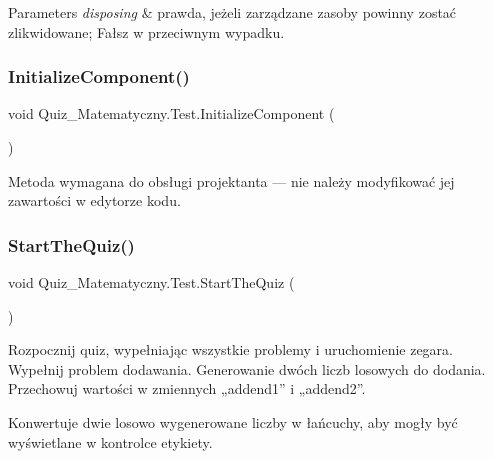 \begin{DoxyParams}{Parameters}
{\em disposing} & prawda, jeżeli zarządzane zasoby powinny zostać zlikwidowane; Fałsz w przeciwnym wypadku.\\
\hline
\end{DoxyParams}
\mbox{\label{class_quiz___matematyczny_1_1_test_a6b40aa6b3256a95c2e6b54781d02d7f4}} 
\subsubsection{\texorpdfstring{InitializeComponent()}{InitializeComponent()}}
{\footnotesize\ttfamily void Quiz\+\_\+\+Matematyczny.\+Test.\+Initialize\+Component (\begin{DoxyParamCaption}{ }\end{DoxyParamCaption})\hspace{0.3cm}{\ttfamily [private]}}



Metoda wymagana do obsługi projektanta — nie należy modyfikować jej zawartości w edytorze kodu. 

\mbox{\label{class_quiz___matematyczny_1_1_test_a1573753aacf25f312207d67b109e96bf}} 
\subsubsection{\texorpdfstring{StartTheQuiz()}{StartTheQuiz()}}
{\footnotesize\ttfamily void Quiz\+\_\+\+Matematyczny.\+Test.\+Start\+The\+Quiz (\begin{DoxyParamCaption}{ }\end{DoxyParamCaption})}

Rozpocznij quiz, wypełniając wszystkie problemy i uruchomienie zegara. Wypełnij problem dodawania. Generowanie dwóch liczb losowych do dodania. Przechowuj wartości w zmiennych „addend1” i „addend2”.

Konwertuje dwie losowo wygenerowane liczby w łańcuchy, aby mogły być wyświetlane w kontrolce etykiety.

